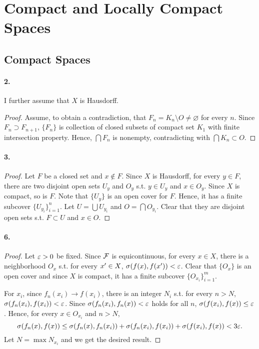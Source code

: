 \section{Compact and Locally Compact Spaces}
\subsection{Compact Spaces}

\paragraph{2.}
  I further assume that $X$ is Hausdorff. 
\begin{proof}
  Assume, to obtain a contradiction, that $F_n = K_n\setminus O \ne\varnothing$
  for every $n$. Since $F_n \supset F_{n+1}$, $\{F_n\}$ is collection of closed
  subsets of compact set $K_1$ with finite intersection property. Hence, 
  $\bigcap F_n$ is nonempty, contradicting with $\bigcap K_n \subset O$. 
\end{proof}

\paragraph{3.}
\begin{proof}
  Let $F$ be a closed set and $x \notin F$. Since $X$ is Hausdorff, for every
  $y \in F$, there are two disjoint open sets $U_y$ and $O_y$ s.t. $y \in U_y$
  and $x \in O_y$. Since $X$ is compact, so is $F$. Note that $\{U_y\}$ is an
  open cover for $F$. Hence, it has a finite subcover $\{U_{y_i}\}_{i=1}^n$.
  Let $U = \bigcup U_{y_i}$ and $O = \bigcap O_{y_i}$. Clear that they are
  disjoint open sets s.t. $F \subset U$ and $x \in O$.
\end{proof}

\paragraph{6.}
\begin{proof}
  Let $\varepsilon > 0$ be fixed. Since $\mathcal{F}$ is equicontinuous, for every 
  $x \in X$, there is a neighborhood $O_x$ s.t. for every $x^\prime \in X$,
  $\sigma(f(x), f(x^\prime)) < \varepsilon$. Clear that $\{O_x\}$ is an open cover and
  since $X$ is compact, it has a finite subcover $\{O_{x_i}\}_{i=1}^m$. 
  
  For $x_i$, since $f_n(x_i) \to f(x_i)$, there is an integer $N_i$ s.t. for  
  every $n > N$, $\sigma(f_n(x_i), f(x_i)) < \varepsilon$. Since $\sigma(f_n(x_i), 
  f_n(x)) < \varepsilon$ holds for all $n$, $\sigma(f(x_i), f(x)) \le \varepsilon$.
  Hence, for every $x \in O_{x_i}$ and $n > N$,
  \[
    \sigma(f_n(x), f(x))
    \le \sigma(f_n(x), f_n(x_i)) + \sigma(f_n(x_i), f(x_i)) 
      + \sigma(f(x_i), f(x))
    < 3\varepsilon.
  \]
  Let $N = \max N_{x_i}$ and we get the desired result.
\end{proof}

